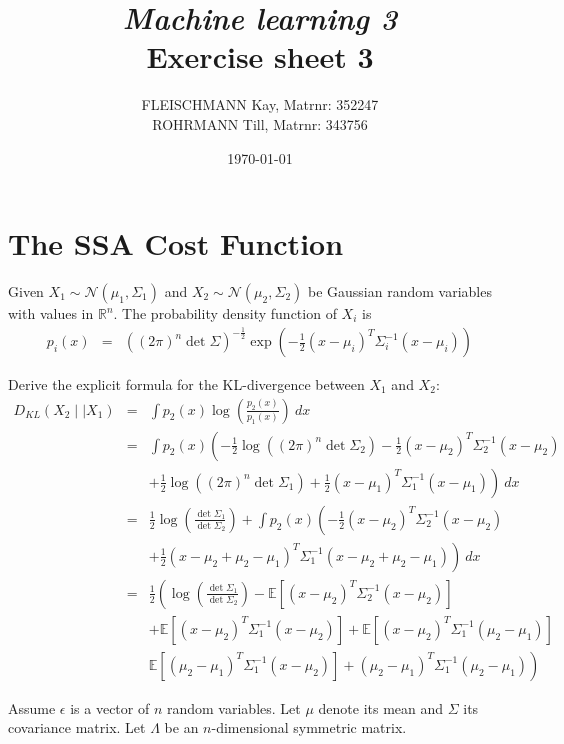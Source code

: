 \documentclass[a4paper, 12pt, titlepage]{article}
\title
{{\em Machine learning 3}\\
Exercise sheet 3}
\author{FLEISCHMANN Kay, Matrnr: 352247\\
	ROHRMANN Till, Matrnr: 343756}
\date{\today}
\begin{document}
\maketitle

\setcounter{section}{2}

\section{The SSA Cost Function}

Given $X_1 \sim \mathcal{N}(\mu_1,\Sigma_1)$ and $X_2 \sim \mathcal{N}(\mu_2,\Sigma_2)$ be Gaussian random variables with values in $\mathbb{R}^n$.
The probability density function of $X_i$ is
\begin{eqnarray}
	p_{i}(x) &=& \left ( (2\pi)^n \det \Sigma \right)^{-\frac{1}{2}} \exp\left ( -\frac{1}{2} (x-\mu_i)^T\Sigma_i^{-1}(x-\mu_i)\right)
\end{eqnarray}

Derive the explicit formula for the KL-divergence between $X_1$ and $X_2$:
\begin{eqnarray}
	D_{KL}(X_2 \mid\mid X_1) &=& \int p_2(x) \log\left( \frac{p_2(x)}{p_1(x)} \right)\ dx \\
	&=& \int p_2(x) \left( -\frac{1}{2}\log\left( (2\pi)^n \det \Sigma_2 \right) -\frac{1}{2}(x-\mu_2)^T\Sigma_2^{-1}(x-\mu_2)  \right. \nonumber \\
	&& \left. +\frac{1}{2}\log\left( (2\pi)^n \det \Sigma_1 \right) + \frac{1}{2}(x-\mu_1)^T\Sigma_1^{-1}(x-\mu_1) \right)\ dx \\
	&=& \frac{1}{2}\log\left( \frac{\det \Sigma_1}{\det \Sigma_2} \right) + \int p_2(x) \left( -\frac{1}{2}(x-\mu_2)^T\Sigma_2^{-1}(x-\mu_2) \right. \nonumber\\
	&& \left. +\frac{1}{2} (x-\mu_2 +\mu_2 -\mu_1)^T\Sigma^{-1}_1(x-\mu_2+\mu_2-\mu_1) \right)\ dx \\
	&=& \frac{1}{2}\left( \log\left( \frac{\det\Sigma_1}{\det\Sigma_2} \right) - \mathbb{E}\left[(x-\mu_2)^T\Sigma_2^{-1}(x-\mu_2) \right] \right. \nonumber \\
	&& \left. + \mathbb{E}\left[(x-\mu_2)^T\Sigma_1^{-1}(x-\mu_2) \right] + \mathbb{E}\left[ (x-\mu_2)^T\Sigma_1^{-1}(\mu_2-\mu_1) \right] \right. \nonumber \\
	&& \left. \mathbb{E}\left[(\mu_2-\mu_1)^T\Sigma_1^{-1}(x-\mu_2) \right] + (\mu_2-\mu_1)^T\Sigma_1^{-1}(\mu_2-\mu_1) \right) \label{eq:exp}
\end{eqnarray}

Assume $\epsilon$ is a vector of $n$ random variables. Let $\mu$ denote its mean and $\Sigma$ its covariance matrix. Let $\Lambda$ be an $n$-dimensional symmetric matrix.
\end{document}
